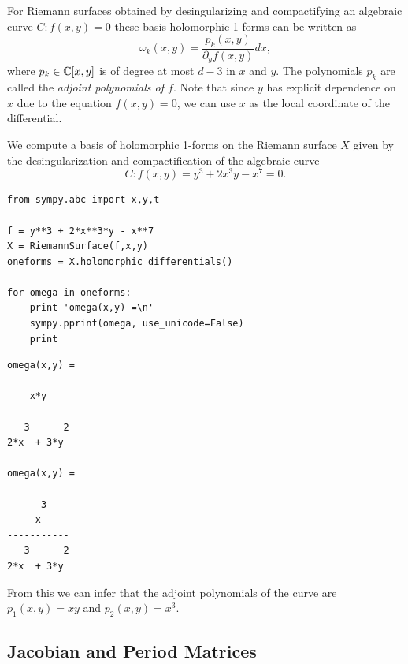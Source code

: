 For Riemann surfaces obtained by desingularizing and compactifying an algebraic
curve $C : f(x,y) = 0$ these basis holomorphic 1-forms can be written as
\begin{equation*}
  \omega_k(x,y) = \frac{p_k(x,y)}{\partial_y f(x,y)} dx,
\end{equation*}
where $p_k \in \operatorname{\mathbb{C}}[x,y]$ is of degree at most $d-3$ in $x$ and $y$. The
polynomials $p_k$ are called the {\it adjoint polynomials of $f$}. Note that
since $y$ has explicit dependence on $x$ due to the equation $f(x,y) = 0$, we
can use $x$ as the local coordinate of the differential.

We compute a basis of holomorphic 1-forms on the Riemann surface $X$ given by
the desingularization and compactification of the algebraic curve
\[
  C : f(x,y) = y^3 + 2x^3y - x^7 = 0.
\]
\begin{lstlisting}
from sympy.abc import x,y,t

f = y**3 + 2*x**3*y - x**7
X = RiemannSurface(f,x,y)
oneforms = X.holomorphic_differentials()

for omega in oneforms:
    print 'omega(x,y) =\n'
    sympy.pprint(omega, use_unicode=False)
    print
\end{lstlisting}
\begin{lstlisting}
omega(x,y) =

    x*y    
-----------
   3      2
2*x  + 3*y 

omega(x,y) =

      3    
     x     
-----------
   3      2
2*x  + 3*y
\end{lstlisting}
From this we can infer that the adjoint polynomials of the curve are $p_1(x,y) =
xy$ and $p_2(x,y) = x^3$.


\subsection{Jacobian and Period
  Matrices}\label{subsec:background-jacobian-and-period-matrices}

